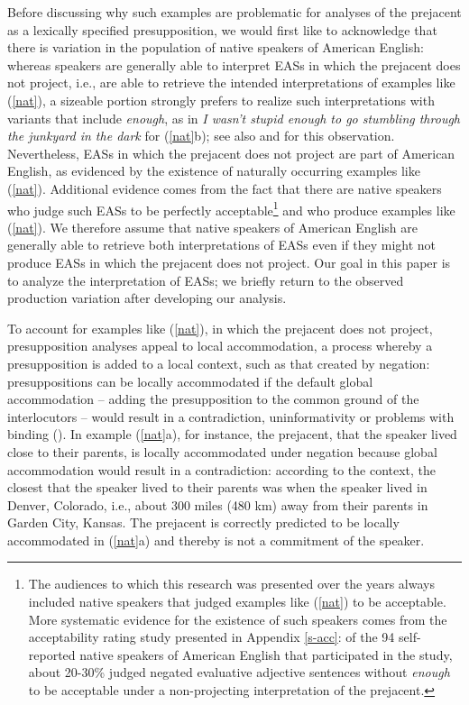 \documentclass[11pt,fleqn]{article}
\newcommand{\6}{\mbox{$[\hspace*{-.6mm}[$}}
\newcommand{\9}{\mbox{$]\hspace*{-.6mm}]$}}
\begin{document}
Before discussing why such examples are problematic for analyses of the prejacent as a lexically specified presupposition, we would first like to acknowledge that there is variation in the population of native speakers of American English: whereas speakers are generally able to interpret EASs in which the prejacent does not project, i.e., are able to retrieve the intended interpretations of examples like (\ref{nat}), a sizeable portion strongly prefers to realize such interpretations with variants that include {\em enough}, as in {\em I wasn't stupid enough to go stumbling through the junkyard in the dark} for (\ref{nat}b); see also \citealt{karttunen2013} and \citealt{karttunen-etal2014} for this observation. Nevertheless, EASs in which the prejacent does not project are part of American English, as evidenced by the existence of naturally occurring examples like (\ref{nat}). Additional evidence comes from the fact that there are native speakers who judge such EASs to be perfectly acceptable\footnote{The audiences to which this research was presented over the years always included native speakers that judged examples like (\ref{nat}) to be acceptable. More systematic evidence for the existence of such speakers comes from the acceptability rating study presented in Appendix \ref{s-acc}: of the 94 self-reported native speakers of American English that participated in the study, about 20-30\% judged negated evaluative adjective sentences without {\em enough} to be acceptable under a non-projecting interpretation of the prejacent.} and who produce examples like (\ref{nat}). We therefore assume that native speakers of American English are generally able to retrieve both interpretations of EASs even if they might not produce EASs in which the prejacent does not project. Our goal in this paper is to analyze the interpretation of EASs; we briefly return to the observed production variation after developing our analysis.

To account for examples like (\ref{nat}), in which the prejacent does not project, presupposition analyses appeal to local accommodation, a process whereby a presupposition is added to a local context, such as that created by negation: presuppositions can be locally accommodated if the default global accommodation -- adding the presupposition to the common ground of the interlocutors -- would result in a contradiction, uninformativity or problems with
binding (\citealt{heim82,vds92}). In example (\ref{nat}a), for instance, the prejacent, that the speaker lived close to their parents, is locally accommodated under negation because global accommodation would result in a contradiction: 
according to the context, the closest that the speaker lived to their parents was when the speaker lived in Denver, Colorado, i.e., about 300 miles (480 km) away from their parents in Garden City, Kansas. The prejacent is correctly predicted to be locally accommodated in (\ref{nat}a) and thereby is not a commitment of the speaker.
\end{document}
